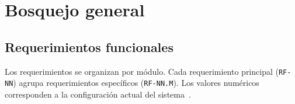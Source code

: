 \chapter{Bosquejo general}
\label{cap:bosquejo}

\section{Requerimientos funcionales}
\label{sec:rf}

Los requerimientos se organizan por módulo. Cada requerimiento principal
(\texttt{RF-NN}) agrupa requerimientos específicos (\texttt{RF-NN.M}). Los
valores numéricos corresponden a la configuración actual del
sistema~\cite{rep-tecnico}.


